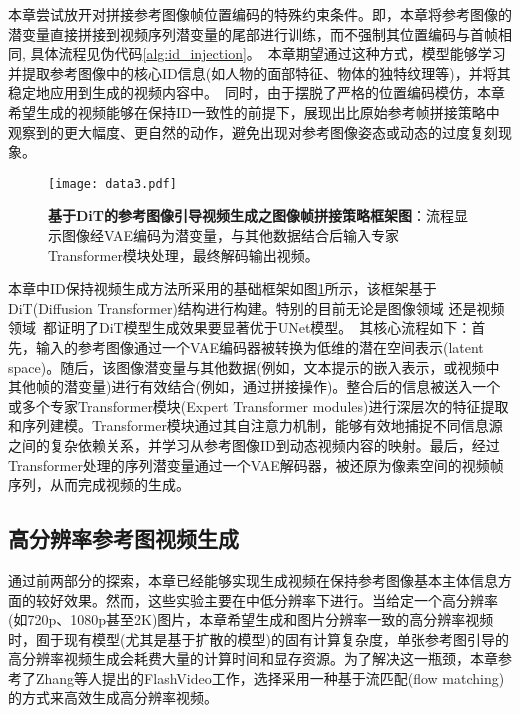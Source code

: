 本章尝试放开对拼接参考图像帧位置编码的特殊约束条件。即，本章将参考图像的潜变量直接拼接到视频序列潜变量的尾部进行训练，而不强制其位置编码与首帧相同, 具体流程见伪代码\ref{alg:id_injection}。\
本章期望通过这种方式，模型能够学习并提取参考图像中的核心ID信息(如人物的面部特征、物体的独特纹理等)，并将其稳定地应用到生成的视频内容中。\
同时，由于摆脱了严格的位置编码模仿，本章希望生成的视频能够在保持ID一致性的前提下，展现出比原始参考帧拼接策略中观察到的更大幅度、更自然的动作，避免出现对参考图像姿态或动态的过度复刻现象。
\begin{figure}[H]
    \centering
    \texttt{[image: data3.pdf]}
    \caption{\textbf{基于DiT的参考图像引导视频生成之图像帧拼接策略框架图}：流程显示图像经VAE编码为潜变量，与其他数据结合后输入专家Transformer模块处理，最终解码输出视频。}
    \label{architecture1}
\end{figure}
本章中ID保持视频生成方法所采用的基础框架如图\ref{architecture1}所示，该框架基于DiT(Diffusion Transformer)结构进行构建。特别的目前无论是图像领域\cite{peebles2023scalable,chen2023pixart} 还是视频领域~\cite{hong2022cogvideo, yang2024cogvideox, kong2024hunyuanvideo, lin2024open}都证明了DiT模型生成效果要显著优于UNet模型。\
其核心流程如下：首先，输入的参考图像通过一个VAE编码器被转换为低维的潜在空间表示(latent space)。随后，该图像潜变量与其他数据(例如，文本提示的嵌入表示，或视频中其他帧的潜变量)进行有效结合(例如，通过拼接操作)。整合后的信息被送入一个或多个专家Transformer模块(Expert Transformer modules)进行深层次的特征提取和序列建模。Transformer模块通过其自注意力机制，能够有效地捕捉不同信息源之间的复杂依赖关系，并学习从参考图像ID到动态视频内容的映射。最后，经过Transformer处理的序列潜变量通过一个VAE解码器，被还原为像素空间的视频帧序列，从而完成视频的生成。


\subsection{高分辨率参考图视频生成}
通过前两部分的探索，本章已经能够实现生成视频在保持参考图像基本主体信息方面的较好效果。然而，这些实验主要在中低分辨率下进行。当给定一个高分辨率(如720p、1080p甚至2K)图片，本章希望生成和图片分辨率一致的高分辨率视频时，囿于现有模型(尤其是基于扩散的模型)的固有计算复杂度，单张参考图引导的高分辨率视频生成会耗费大量的计算时间和显存资源。为了解决这一瓶颈，本章参考了Zhang等人提出的FlashVideo\cite{zhang2025flashvideo}工作，选择采用一种基于流匹配(flow matching)的方式来高效生成高分辨率视频。


